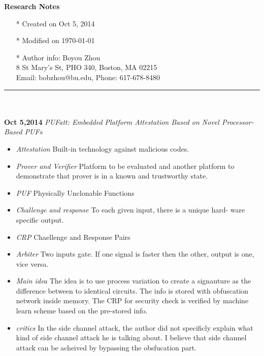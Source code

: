 \documentclass[]{article}
\begin{document}
\pagestyle{empty}
{\large\textbf{Research Notes}}
\begin{itemize}
    \item[*] Created on Oct 5, 2014
    \item[*] Modified on \today
    \item[*] Author info: Boyou Zhou\\
             8 St Mary's St, PHO 340, Boston, MA 02215\\
             Email: bobzhou@bu.edu, Phone: 617-678-8480
\end{itemize}


\rule[-0.1cm]{7.5in}{0.01cm}\\
\\
\noindent \textbf{Oct 5,2014}
\textit{PUFatt: Embedded Platform Attestation Based on Novel Processor-Based PUFs}
\indent		\begin{itemize}
            \item \textit{Attestation} Built-in technology against malicious codes.

            \item \textit{Prover and Verifier} Platform to be evaluated and another platform
            to demonstrate that prover is in a known and trustworthy state.

            \item \textit{PUF} Physically Unclonable Functions

            \item \textit{Challenge and response} To each given input, there is a unique hard-
            ware specific output.

            \item \textit{CRP} Chaellenge and Response Pairs

            \item \textit{Arbiter} Two inputs gate. If one signal is faster then the other, output
            is one, vice versa.

            \item \textit{Main idea} The idea is to use process variation to create a signauture
            as the difference between to identical circuits.  The info is stored with obfuscation 
            network inside memory. The CRP for security check is verified by machine learn scheme
            based on the pre-stored info.

            \item \textit{critics} In the side channel attack, the author did not specificly explain
            what kind of side channel attack he is talking about. I believe that side channel attack
            can be acheived by bypassing the obsfucation part.
        \end{itemize}
\end{document}
